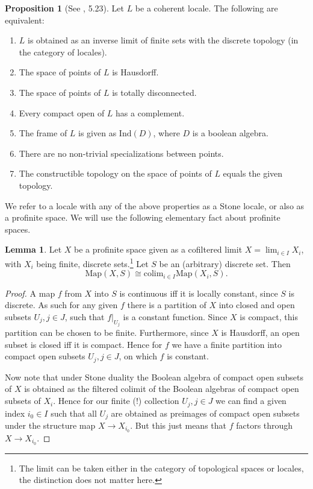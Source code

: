 \documentclass[10pt]{amsart}
\theoremstyle{definition}
\newtheorem{lemma}[theorem]{Lemma}
\newtheorem{proposition}[theorem]{Proposition}
\begin{document}
\begin{proposition}[See \cite{stacks-project}, 5.23]
Let $L$ be a coherent locale. The following are equivalent:
\begin{enumerate}
\item $L$ is obtained as an inverse limit of finite sets with the discrete topology (in the category of locales).
\item The space of points of $L$ is Hausdorff.
\item The space of points of $L$ is totally disconnected.
\item Every compact open of $L$ has a complement.
\item The frame of $L$ is given as $\mathrm{Ind}(D)$, where $D$ is a boolean algebra.
\item There are no non-trivial specializations between points.
\item The constructible topology on the space of points of $L$ equals the given topology.
\end{enumerate}
\end{proposition}

We refer to a locale with any of the above properties as a Stone locale, or also as a profinite space. We will use the following elementary fact about profinite spaces.

\begin{lemma} \label{profinitecontinuous}
Let $X$ be a profinite space given as a cofiltered limit $X = \lim_{i \in I} X_i$, with $X_i$ being finite, discrete sets.\footnote{The limit can be taken either in the category of topological spaces or locales, the distinction does not matter here.} Let $S$ be an (arbitrary) discrete set. Then
$$ \mathrm{Map}( X, S ) \cong \mathrm{colim}_{i \in I} \mathrm{Map}( X_i, S ).$$
\end{lemma}

\begin{proof}
A map $f$ from $X$ into $S$ is continuous iff it is locally constant, since $S$ is discrete. As such for any given $f$ there is a partition of $X$ into closed and open subsets $U_j, j \in J$, such that $f|_{U_j}$ is a constant function. Since $X$ is compact, this partition can be chosen to be finite. Furthermore, since $X$ is Hausdorff, an open subset is closed iff it is compact. Hence for $f$ we have a finite partition into compact open subsets $U_j, j \in J$, on which $f$ is constant.

Now note that under Stone duality the Boolean algebra of compact open subsets of $X$ is obtained as the filtered colimit of the Boolean algebras of compact open subsets of $X_i$. Hence for our finite (!) collection $U_j, j \in J$ we can find a given index $i_0 \in I$ such that all $U_j$ are obtained as preimages of compact open subsets under the structure map $X \rightarrow X_{i_0}$. But this just means that $f$ factors through $X \rightarrow X_{i_0}$.
\end{proof}
\end{document}
